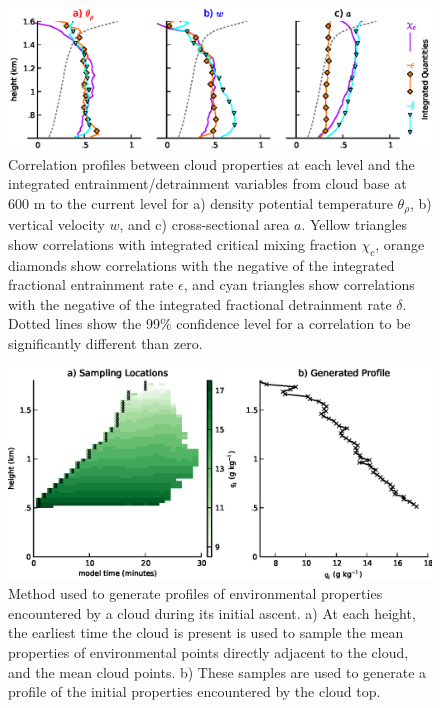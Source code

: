\documentclass[acp]{copernicus}
\begin{document}
\begin{figure}[t]
\vspace*{2mm}
\begin{center}
\includegraphics[width=\textwidth]{./figures/cloud_base_integrals_env}
\end{center}
\caption{Correlation profiles between cloud properties at each level and the 
integrated entrainment/detrainment variables from cloud base at 600 m to the 
current level for a) density potential temperature $\theta_\rho$, b) 
vertical velocity $w$, and c) cross-sectional area $a$.  Yellow triangles show 
correlations with integrated critical mixing fraction $\chi_c$, orange 
diamonds show correlations with the negative of the integrated fractional 
entrainment rate $\epsilon$, and cyan triangles show correlations with the 
negative of the integrated fractional detrainment rate $\delta$.  Dotted lines 
show the 99\% confidence level for a correlation to be significantly different 
than zero.}
\label{fig:cloud_base_integrals_env}
\end{figure}

\begin{figure}[t]
\vspace*{2mm}
\begin{center}
\includegraphics[width=\textwidth]{./figures/cloud_environment_schematic}
\end{center}
\caption{Method used to generate profiles of environmental properties 
encountered by a cloud during its initial ascent.  a) At each height, the 
earliest time the cloud is present is used to sample the mean properties of 
environmental points directly adjacent to the cloud, and the mean cloud points. 
b) These samples are used to generate a profile of the initial properties 
encountered by the cloud top.}
\label{fig:cloud_environment_schematic}
\end{figure}
\end{document}
